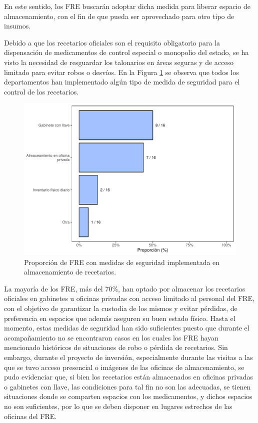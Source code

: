 \documentclass[
]{book}
\begin{document}
En este sentido, los FRE buscarán adoptar dicha medida para liberar espacio de almacenamiento, con el fin de que pueda ser aprovechado para otro tipo de insumos.

Debido a que los recetarios oficiales son el requisito obligatorio para la dispensación de medicamentos de control especial o monopolio del estado, se ha visto la necesidad de resguardar los talonarios en áreas seguras y de acceso limitado para evitar robos o desvíos. En la Figura \ref{fig:MedidasSeguridad-Almacenamiento} se observa que todos los departamentos han implementado algún tipo de medida de seguridad para el control de los recetarios.

\begin{figure}

{\centering \includegraphics[width=0.85\linewidth]{InformeFinal_files/figure-latex/MedidasSeguridad-Almacenamiento-1} 

}

\caption{Proporción de FRE con medidas de seguridad implementada en almacenamiento de recetarios.}\label{fig:MedidasSeguridad-Almacenamiento}
\end{figure}

La mayoría de los FRE, más del 70\%, han optado por almacenar los recetarios oficiales en gabinetes u oficinas privadas con acceso limitado al personal del FRE, con el objetivo de garantizar la custodia de los mismos y evitar pérdidas, de preferencia en espacios que además aseguren su buen estado físico. Hasta el momento, estas medidas de seguridad han sido suficientes puesto que durante el acompañamiento no se encontraron casos en los cuales los FRE hayan mencionado históricos de situaciones de robo o pérdida de recetarios. Sin embargo, durante el proyecto de inversión, especialmente durante las visitas a las que se tuvo acceso presencial o imágenes de las oficinas de almacenamiento, se pudo evidenciar que, si bien los recetarios están almacenados en oficinas privadas o gabinetes con llave, las condiciones para tal fin no son las adecuadas, se tienen situaciones donde se comparten espacios con los medicamentos, y dichos espacios no son suficientes, por lo que se deben disponer en lugares estrechos de las oficinas del FRE.
\end{document}
